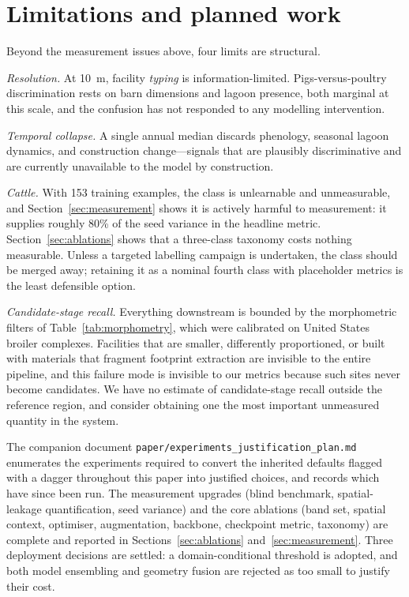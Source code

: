 \documentclass[11pt,a4paper]{article}
\newcommand{\code}[1]{\texttt{\small #1}}
\begin{document}
\section{Limitations and planned work}
\label{sec:limitations}

Beyond the measurement issues above, four limits are structural.

\emph{Resolution.} At \SI{10}{\metre}, facility \emph{typing} is
information-limited. Pigs-versus-poultry discrimination rests on barn dimensions
and lagoon presence, both marginal at this scale, and the confusion has not
responded to any modelling intervention.

\emph{Temporal collapse.} A single annual median discards phenology, seasonal
lagoon dynamics, and construction change---signals that are plausibly
discriminative and are currently unavailable to the model by construction.

\emph{Cattle.} With 153 training examples, the class is unlearnable and
unmeasurable, and Section~\ref{sec:measurement} shows it is actively harmful to
measurement: it supplies roughly 80\% of the seed variance in the headline
metric. Section~\ref{sec:ablations} shows that a three-class taxonomy costs
nothing measurable. Unless a targeted labelling campaign is undertaken, the class
should be merged away; retaining it as a nominal fourth class with placeholder
metrics is the least defensible option.

\emph{Candidate-stage recall.} Everything downstream is bounded by the
morphometric filters of Table~\ref{tab:morphometry}, which were calibrated on
United States broiler complexes. Facilities that are smaller, differently
proportioned, or built with materials that fragment footprint extraction are
invisible to the entire pipeline, and this failure mode is invisible to our
metrics because such sites never become candidates. We have no estimate of
candidate-stage recall outside the reference region, and consider obtaining one
the most important unmeasured quantity in the system.

The companion document \code{paper/experiments\_justification\_plan.md}
enumerates the experiments required to convert the inherited defaults flagged
with a dagger throughout this paper into justified choices, and records which
have since been run. The measurement upgrades (blind benchmark, spatial-leakage
quantification, seed variance) and the core ablations (band set, spatial context,
optimiser, augmentation, backbone, checkpoint metric, taxonomy) are complete and
reported in Sections~\ref{sec:ablations} and~\ref{sec:measurement}. Three
deployment decisions are settled: a domain-conditional threshold is adopted, and
both model ensembling and geometry fusion are rejected as too small to justify
their cost.
\end{document}
